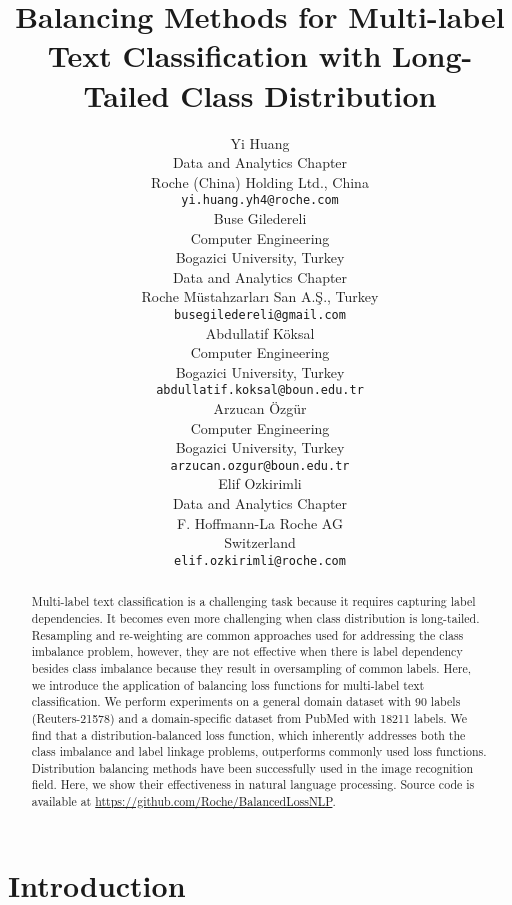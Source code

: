 \documentclass[11pt]{article}
\title{Balancing Methods for Multi-label Text Classification with Long-Tailed Class Distribution}
\author{Yi Huang \\
  Data and Analytics Chapter \\ Roche (China) Holding Ltd., China \\
  \small{\texttt{yi.huang.yh4@roche.com}} \\\And
  Buse Giledereli \\
  Computer Engineering \\ Bogazici University, Turkey \\
  Data and Analytics Chapter \\ Roche Müstahzarları San A.Ş., Turkey \\
  \small{\texttt{busegiledereli@gmail.com}} \\\AND
  Abdullatif Köksal \\
  Computer Engineering \\ Bogazici University, Turkey \\
  \small{\texttt{abdullatif.koksal@boun.edu.tr}} \\\And
  Arzucan Özgür \\
  Computer Engineering \\ Bogazici University, Turkey \\
  \small{\texttt{arzucan.ozgur@boun.edu.tr}} \\\And
  Elif Ozkirimli \\
  Data and Analytics Chapter \\ F. Hoffmann-La Roche AG \\ Switzerland \\
  \small{\texttt{elif.ozkirimli@roche.com}} \\}
\begin{document}
\maketitle
\begin{abstract}


Multi-label text classification is a challenging task because it requires capturing label dependencies. It becomes even more challenging when class distribution is long-tailed. Resampling and re-weighting are common approaches used for addressing the class imbalance problem, however, they are not effective when there is label dependency besides class imbalance because they result in oversampling of common labels. Here, we introduce the application of balancing loss functions 
for multi-label text classification. We perform experiments on a general domain dataset with 90 labels (Reuters-21578) and a domain-specific dataset from PubMed with 18211 labels. We find that a distribution-balanced loss function, which inherently addresses both the class imbalance and label linkage problems, outperforms commonly used loss functions. Distribution balancing methods have been successfully used in the image recognition field. Here, we show their effectiveness in natural language processing. Source code is available at \url{https://github.com/Roche/BalancedLossNLP}.











\end{abstract}

\section{Introduction}
\end{document}

